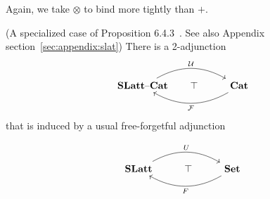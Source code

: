 Again, we take $\otimes$ to bind more tightly than $+$.


\begin{proposition}(A specialized case of Proposition 6.4.3~\cite{Borceux_1994}. See also Appendix section~\ref{sec:appendix:slat})
There is a 2-adjunction 
\[\begin{tikzcd}
	\catname{SLatt}\text{--}\catname{Cat}\arrow[rr, "\mathcal{U}", bend left] & \hspace{-1em}\top & \catname{Cat} \arrow[ll, "\mathcal{F}", bend left]
	\end{tikzcd}
\]
that is induced by a usual free-forgetful adjunction 

\[\begin{tikzcd}
	\catname{SLatt} \arrow[rr, "U", bend left] & \top & \catname{Set} \arrow[ll, "F", bend left]
	\end{tikzcd}
\]
\end{proposition}

